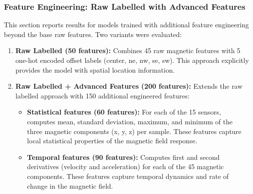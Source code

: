 \documentclass[11pt,a4paper]{article}
\begin{document}
\subsubsection{Feature Engineering: Raw Labelled with Advanced Features}
This section reports results for models trained with additional feature engineering beyond the base raw features. Two variants were evaluated:

\begin{enumerate}[leftmargin=1.5em]
    \item \textbf{Raw Labelled (50 features):} Combines 45 raw magnetic features with 5 one-hot encoded offset labels (center, ne, nw, se, sw). This approach explicitly provides the model with spatial location information.
    \item \textbf{Raw Labelled + Advanced Features (200 features):} Extends the raw labelled approach with 150 additional engineered features:
    \begin{itemize}[leftmargin=1.5em]
        \item \textbf{Statistical features (60 features):} For each of the 15 sensors, computes mean, standard deviation, maximum, and minimum of the three magnetic components (x, y, z) per sample. These features capture local statistical properties of the magnetic field response.
        \item \textbf{Temporal features (90 features):} Computes first and second derivatives (velocity and acceleration) for each of the 45 magnetic components. These features capture temporal dynamics and rate of change in the magnetic field.
    \end{itemize}
\end{enumerate}
\end{document}
